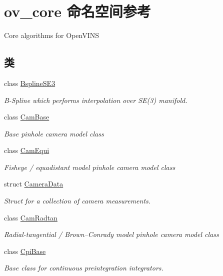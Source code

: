 \hypertarget{namespaceov__core}{}\section{ov\+\_\+core 命名空间参考}
\label{namespaceov__core}


Core algorithms for Open\+V\+I\+NS  


\subsection*{类}
\begin{DoxyCompactItemize}
\item 
class \hyperlink{classov__core_1_1BsplineSE3}{Bspline\+S\+E3}
\begin{DoxyCompactList}\small\item\em B-\/\+Spline which performs interpolation over S\+E(3) manifold. \end{DoxyCompactList}\item 
class \hyperlink{classov__core_1_1CamBase}{Cam\+Base}
\begin{DoxyCompactList}\small\item\em Base pinhole camera model class \end{DoxyCompactList}\item 
class \hyperlink{classov__core_1_1CamEqui}{Cam\+Equi}
\begin{DoxyCompactList}\small\item\em Fisheye / equadistant model pinhole camera model class \end{DoxyCompactList}\item 
struct \hyperlink{structov__core_1_1CameraData}{Camera\+Data}
\begin{DoxyCompactList}\small\item\em Struct for a collection of camera measurements. \end{DoxyCompactList}\item 
class \hyperlink{classov__core_1_1CamRadtan}{Cam\+Radtan}
\begin{DoxyCompactList}\small\item\em Radial-\/tangential / Brown–\+Conrady model pinhole camera model class \end{DoxyCompactList}\item 
class \hyperlink{classov__core_1_1CpiBase}{Cpi\+Base}
\begin{DoxyCompactList}\small\item\em Base class for continuous preintegration integrators. \end{DoxyCompactList}\item 

\end{DoxyCompactItemize}
